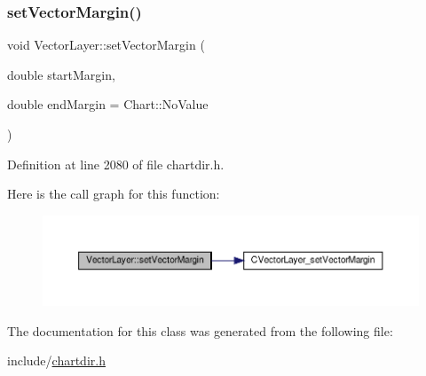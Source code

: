 \subsubsection{\texorpdfstring{set\+Vector\+Margin()}{setVectorMargin()}}
{\footnotesize\ttfamily void Vector\+Layer\+::set\+Vector\+Margin (\begin{DoxyParamCaption}\item[{double}]{start\+Margin,  }\item[{double}]{end\+Margin = {\ttfamily Chart\+:\+:NoValue} }\end{DoxyParamCaption})\hspace{0.3cm}{\ttfamily [inline]}}



Definition at line 2080 of file chartdir.\+h.

Here is the call graph for this function\+:
\nopagebreak
\begin{figure}[H]
\begin{center}
\leavevmode
\includegraphics[width=350pt]{class_vector_layer_a150bc907bcb2eb5d398a908a1bd09082_cgraph}
\end{center}
\end{figure}


The documentation for this class was generated from the following file\+:\begin{DoxyCompactItemize}
\item 
include/\hyperlink{chartdir_8h}{chartdir.\+h}\end{DoxyCompactItemize}
